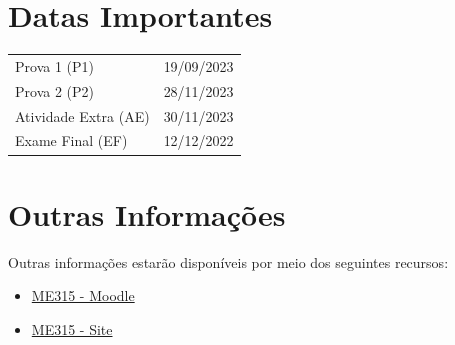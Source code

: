 \documentclass[paper=letter, fontsize=12pt]{scrartcl} %
\begin{document}
\section{Datas Importantes}

\begin{tabular}{ll}
Prova 1 (P1) & 19/09/2023 \\
Prova 2 (P2) & 28/11/2023 \\
Atividade Extra (AE) & 30/11/2023 \\
Exame Final (EF) & 12/12/2022 \\
\end{tabular}

\section{Outras Informações}

Outras informações estarão disponíveis por meio dos seguintes recursos:

\begin{itemize}
\item \href{https://moodle.ggte.unicamp.br/course/view.php?id=17205}{{\color{blue} ME315 - Moodle}}
\item \href{https://me315-unicamp.github.io}{{\color{blue} ME315 - Site}}
\end{itemize}
\end{document}
